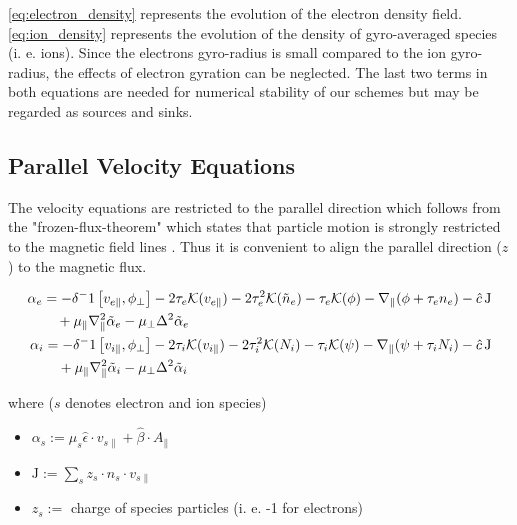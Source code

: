 \documentclass[master.tex]{subfiles}
\begin{document}
\autoref{eq:electron_density} represents the evolution of the electron density field.
\autoref{eq:ion_density} represents the evolution of the density of gyro-averaged species (i. e. ions). Since the electrons gyro-radius is small compared to the ion gyro-radius, the effects of electron gyration can be neglected. \newline
The last two terms in both equations are needed for numerical stability of our schemes but may be regarded as sources and sinks. 


\subsection{Parallel Velocity Equations}
The velocity equations are restricted to the parallel direction which follows from the "frozen-flux-theorem" which states that particle motion is strongly restricted to the magnetic field lines . Thus it is convenient to align the parallel direction ($z$) to the magnetic flux.


\begin{align}
\begin{split}
    \alpha_e &=  -\delta^-1 \left[v_{e\parallel}, \phi_\perp\right]
    - 2\tau_e \mathcal{K}( v_{e\parallel})
    - 2\tau_e^2 \mathcal{K}(\Tilde{n}_e)
    - \tau_e \mathcal{K}( \phi)
    - \nabla_\parallel (\phi + \tau_e n_e)
    - \hat{c}\, \mathrm{J}\\
    & \quad + \mu_\parallel \nabla_\parallel^2\Tilde{\alpha}_e 
    - \mu_\perp \Delta^2\Tilde{\alpha}_e \label{eq:electron_velocity}
\end{split}\\
\begin{split}
    \alpha_i &= -\delta^-1  \left[v_{i\parallel}, \phi_\perp\right]
    - 2\tau_i \mathcal{K}(v_{i\parallel})
    - 2\tau_i^2 \mathcal{K}(N_i)
    - \tau_i \mathcal{K}(\psi)
    - \nabla_\parallel (\psi + \tau_i N_i)
    - \hat{c}\, \mathrm{J}\\
    &\quad + \mu_\parallel\nabla_\parallel^2\Tilde{\alpha}_i 
    - \mu_\perp \Delta^2\Tilde{\alpha}_i \label{eq:ion_velocity}
\end{split}
\end{align}

where ($s$ denotes electron and ion species)

\begin{itemize}
    \item $\alpha_s := \mu_s \hat{\epsilon} \cdot v_{s\parallel} + \hat{\beta} \cdot A_{\parallel}$
    \item $\mathrm{J} := \sum_s z_s \cdot n_s \cdot v_{s\parallel}$
    \item $z_s :=$ charge of species particles (i. e. -1 for electrons)
\end{itemize}
\end{document}
